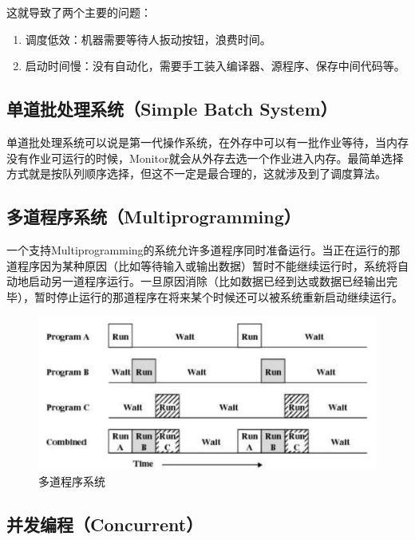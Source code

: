 这就导致了两个主要的问题：

\begin{enumerate}
	\item 调度低效：机器需要等待人扳动按钮，浪费时间。
	\item 启动时间慢：没有自动化，需要手工装入编译器、源程序、保存中间代码等。
\end{enumerate}

\vspace{0.5cm}

\subsection{单道批处理系统（Simple Batch System）}

单道批处理系统可以说是第一代操作系统，在外存中可以有一批作业等待，当内存没有作业可运行的时候，Monitor就会从外存去选一个作业进入内存。最简单选择方式就是按队列顺序选择，但这不一定是最合理的，这就涉及到了调度算法。\\

\subsection{多道程序系统（Multiprogramming）}

一个支持Multiprogramming的系统允许多道程序同时准备运行。当正在运行的那道程序因为某种原因（比如等待输入或输出数据）暂时不能继续运行时，系统将自动地启动另一道程序运行。一旦原因消除（比如数据已经到达或数据已经输出完毕），暂时停止运行的那道程序在将来某个时候还可以被系统重新启动继续运行。

\begin{figure}[H]
	\centering
	\includegraphics[]{img/C1/1-6/2.png}
	\caption{多道程序系统}
\end{figure}

\vspace{0.5cm}

\subsection{并发编程（Concurrent）}

